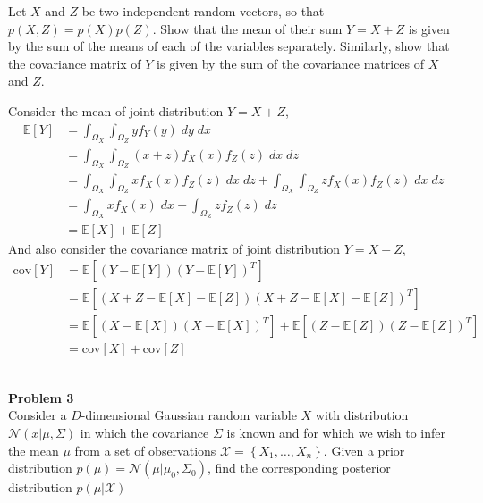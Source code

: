 \documentclass{article}
\begin{document}
Let $X$ and $Z$ be two independent random vectors, so that $p(X, Z) = p(X)p(Z)$. Show that the mean of their sum $Y = X+Z$ is given by the sum of the means of each of the variables separately. Similarly, show that the covariance matrix of $Y$ is given by the sum of the covariance matrices of $X$ and $Z$.
\color{blue}
\begin{sol}
    Consider the mean of joint distribution $Y = X+Z$,
\begin{align*}
    \mathbb{E}[Y] &= \int_{\Omega_X}\int_{\Omega_Z}yf_{Y}(y)\;dy\;dx\\
    &= \int_{\Omega_X}\int_{\Omega_Z}(x+z)f_{X}(x)f_{Z}(z)\;dx\;dz\\
    &= \int_{\Omega_X}\int_{\Omega_Z}xf_{X}(x)f_{Z}(z)\;dx\;dz + \int_{\Omega_X}\int_{\Omega_Z}zf_{X}(x)f_{Z}(z)\;dx\;dz\\
    &= \int_{\Omega_X}xf_{X}(x)\;dx + \int_{\Omega_Z}zf_{Z}(z)\;dz\\
    &= \mathbb{E}[X] + \mathbb{E}[Z]
\end{align*}
And also consider the covariance matrix of joint distribution $Y = X+Z$,
\begin{align*}
    \text{cov}[Y] &= \mathbb{E}\left[\left(Y-\mathbb{E}[Y]\right)\left(Y-\mathbb{E}[Y]\right)^T\right]\\
    &= \mathbb{E}\left[\left(X+Z-\mathbb{E}[X]-\mathbb{E}[Z]\right)\left(X+Z-\mathbb{E}[X]-\mathbb{E}[Z]\right)^T\right]\\
    &= \mathbb{E}\left[\left(X-\mathbb{E}[X]\right)\left(X-\mathbb{E}[X]\right)^T\right] + \mathbb{E}\left[\left(Z-\mathbb{E}[Z]\right)\left(Z-\mathbb{E}[Z]\right)^T\right]\\
    &= \text{cov}[X] + \text{cov}[Z]
\end{align*}
\end{sol}
\color{black}
\leavevmode\\
\noindent
\Large{\textbf{Problem 3}}\normalsize
\\

Consider a $D$-dimensional Gaussian random variable $X$ with distribution $\mathcal{N}(x|\mu,\Sigma)$ in which the covariance $\Sigma$ is known and for which we wish to infer the mean $\mu$ from a set of observations $\mathcal{X} = \left\{X_1,\dots,X_n\right\}$. Given a prior distribution $p(\mu) =\mathcal{N}\left(\mu|\mu_0,\Sigma_0\right) $, find the corresponding posterior distribution $p(\mu|\mathcal{X})$
\end{document}
